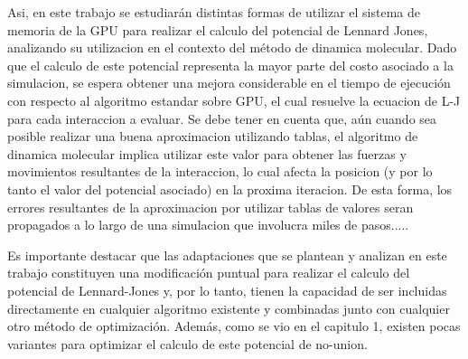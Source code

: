 \documentclass[a4paper,10pt]{report}
\begin{document}

Asi, en este trabajo se estudiarán distintas formas de utilizar el sistema de memoria de la GPU para realizar el calculo del potencial de Lennard Jones, analizando su utilizacion en el contexto del método de dinamica molecular.
Dado que el calculo de este potencial representa la mayor parte del costo asociado a la simulacion, se espera obtener una mejora considerable en el tiempo de ejecución con respecto al algoritmo estandar sobre GPU, el cual resuelve la ecuacion de L-J para cada interaccion a evaluar.
Se debe tener en cuenta que, aún cuando sea posible realizar una buena aproximacion utilizando tablas, el algoritmo de dinamica molecular implica utilizar este valor para obtener las fuerzas y movimientos resultantes de la interaccion, lo cual afecta la posicion (y por lo tanto el valor del potencial asociado) en la proxima iteracion. 
De esta forma, los errores resultantes de la aproximacion por utilizar tablas de valores seran propagados a lo largo de una simulacion que involucra miles de pasos.....

Es importante destacar que las adaptaciones que se plantean y analizan en este trabajo constituyen una modificación puntual para realizar el calculo del potencial de Lennard-Jones y, por lo tanto, tienen la capacidad de ser incluidas directamente en cualquier algoritmo existente y combinadas junto con cualquier otro método de optimización.
Además, como se vio en el capitulo 1, existen pocas variantes para optimizar el calculo de este potencial de no-union.

\end{document}
